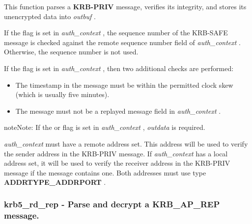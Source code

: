 \documentclass[letterpaper,10pt,english]{sphinxmanual}
\begin{document}
This function parses a \textbf{KRB-PRIV} message, verifies its integrity, and stores its unencrypted data into \emph{outbuf} .

If the {\hyperref[appdev/refs/macros/KRB5_AUTH_CONTEXT_DO_SEQUENCE:KRB5_AUTH_CONTEXT_DO_SEQUENCE]{}} flag is set in \emph{auth\_context} , the sequence number of the KRB-SAFE message is checked against the remote sequence number field of \emph{auth\_context} . Otherwise, the sequence number is not used.

If the {\hyperref[appdev/refs/macros/KRB5_AUTH_CONTEXT_DO_TIME:KRB5_AUTH_CONTEXT_DO_TIME]{}} flag is set in \emph{auth\_context} , then two additional checks are performed:
\begin{itemize}
\item {} 
The timestamp in the message must be within the permitted clock skew (which is usually five minutes).

\item {} 
The message must not be a replayed message field in \emph{auth\_context} .

\end{itemize}

\begin{notice}{note}{Note:}
If the {\hyperref[appdev/refs/macros/KRB5_AUTH_CONTEXT_RET_TIME:KRB5_AUTH_CONTEXT_RET_TIME]{}} or {\hyperref[appdev/refs/macros/KRB5_AUTH_CONTEXT_RET_SEQUENCE:KRB5_AUTH_CONTEXT_RET_SEQUENCE]{}} flag is set in \emph{auth\_context} , \emph{outdata} is required.

\emph{auth\_context} must have a remote address set. This address will be used to verify the sender address in the KRB-PRIV message. If \emph{auth\_context} has a local address set, it will be used to verify the receiver address in the KRB-PRIV message if the message contains one. Both addresses must use type \textbf{ADDRTYPE\_ADDRPORT} .
\end{notice}


\subsubsection{krb5\_rd\_rep -  Parse and decrypt a KRB\_AP\_REP message.}
\label{appdev/refs/api/krb5_rd_rep::doc}\label{appdev/refs/api/krb5_rd_rep:krb5-rd-rep-parse-and-decrypt-a-krb-ap-rep-message}

\begin{fulllineitems}
\label{appdev/refs/api/krb5_rd_rep:krb5_rd_rep}
\end{fulllineitems}
\end{document}
